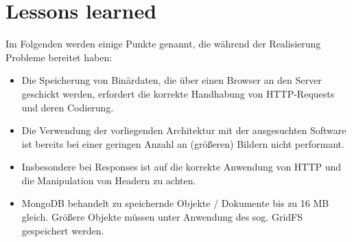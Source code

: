 \clearpage
\section{Lessons learned}
Im Folgenden werden einige Punkte genannt, die während der Realisierung Probleme bereitet haben:
\begin{itemize}
	\item Die Speicherung von Binärdaten, die über einen Browser an den Server geschickt werden,
	erfordert die korrekte Handhabung von HTTP-Requests und deren Codierung.
	\item Die Verwendung der vorliegenden Architektur mit der ausgesuchten Software 
	ist bereits bei einer geringen Anzahl an (größeren) Bildern nicht performant.
	\item Insbesondere bei Responses ist auf die korrekte Anwendung von HTTP und die Manipulation von Headern zu achten.
	\item MongoDB behandelt zu speichernde Objekte / Dokumente bis zu 16 MB gleich. Größere Objekte
	müssen unter Anwendung des sog. GridFS gespeichert werden.
\end{itemize}